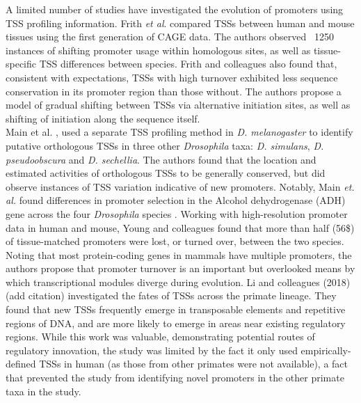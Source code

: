\documentclass[nogrid]{MBE}%
\begin{document}
A limited number of studies have investigated the evolution of promoters using TSS profiling information. Frith \textit{et al}. \citep{Frith.2006} compared TSSs between human and mouse tissues using the first generation of CAGE data. The authors observed ~1250 instances of shifting promoter usage within homologous sites, as well as tissue-specific TSS differences between species. Frith and colleagues also found that, consistent with expectations, TSSs with high turnover exhibited less sequence conservation in its promoter region than those without. The authors propose a model of gradual shifting between TSSs via alternative initiation sites, as well as shifting of initiation along the sequence itself. \\

Main et al. \citep{Main.2013}, used a separate TSS profiling method in \textit{D. melanogaster} to identify putative orthologous TSSs in three other \textit{Drosophila} taxa: \textit{D. simulans}, \textit{D. pseudoobscura} and \textit{D. sechellia}. The authors found that the location and estimated activities of orthologous TSSs to be generally conserved, but did observe instances of TSS variation indicative of new promoters. Notably, Main \textit{et. al.} found differences in promoter selection in the Alcohol dehydrogenase (ADH) gene across the four \textit{Drosophila} species \citep{Main.2013}. Working with high-resolution promoter data in human and mouse, Young and colleagues \citep{Young.2015} found that more than half (56\$) of tissue-matched promoters were lost, or turned over, between the two species. Noting that most protein-coding genes in mammals \citep{Consortium.2014} have multiple promoters, the authors propose that promoter turnover is an important but overlooked means by which transcriptional modules diverge during evolution. Li and colleagues (2018) (add citation) investigated the fates of TSSs across the primate lineage. They found that new TSSs frequently emerge in transposable elements and repetitive regions of DNA, and are more likely to emerge in areas near existing regulatory regions. While this work was valuable, demonstrating potential routes of regulatory innovation, the study was limited by the fact it only used empirically-defined TSSs in human (as those from other primates were not available), a fact that prevented the study from identifying novel promoters in the other primate taxa in the study. \\ 
\end{document}
